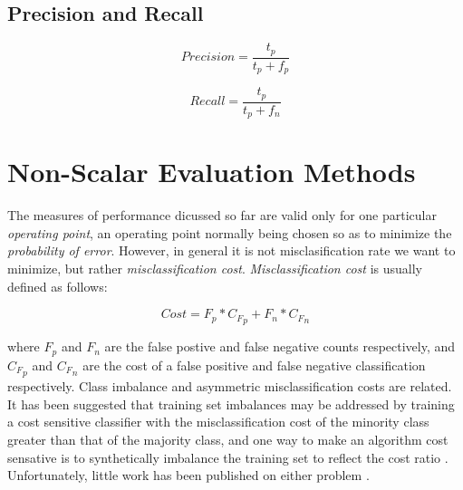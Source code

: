 \documentclass[12pt]{unbthesis}
\begin{document}
\subsection{Precision and Recall}

\begin{equation}
\label{equ:precision}
Precision = \frac{t_p}{t_p + f_p}
\end{equation}


\begin{equation}
\label{equ:recall}
Recall = \frac{t_p}{t_p + f_n}
\end{equation}

\section{Non-Scalar Evaluation Methods}
The measures of performance dicussed so far are valid only for one
particular \textit{operating point}, an operating point normally being
chosen so as to minimize the \textit{probability of error}. However,
in general it is not misclasification rate we want to minimize, but
rather \textit{misclassification cost}. \textit{Misclassification
  cost} is usually defined as follows:

\begin{equation}
\label{equ:misclasscost}
Cost = F_p * {C_F}_p + F_n * {C_F}_n
\end{equation}

where \(F_p\) and \(F_n\) are the false postive and false negative
counts respectively, and \({C_F}_p\) and \({C_F}_n\) are the cost of a
false positive and false negative classification respectively. Class
imbalance and asymmetric misclassification costs are related. It has
been suggested that training
set imbalances may be addressed by training a cost sensitive classifier
with the misclassification cost of the minority class greater than
that of the majority class, and one way to make an algorithm cost
sensative is to synthetically imbalance the training set to reflect
the cost ratio \cite{RefWorks:52}. Unfortunately, little work has been
published on either problem \cite{RefWorks:61}.
\end{document}
